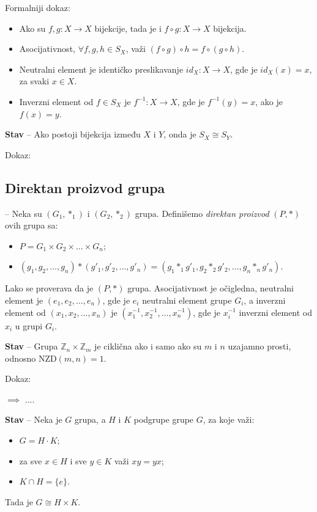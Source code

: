 \documentclass[a4paper,12pt]{article}
\newcommand{\f}[1]{\(#1\)}
\begin{document}
  \medskip
  Formalniji dokaz:

  \begin{itemize}
    \item Ako su \f{f, g: X \rightarrow X} bijekcije, tada je i \f{f \circ g: X \rightarrow X} bijekcija. 
    \item Asocijativnost, \f{ \forall f, g, h \in S_X}, važi \f{(f \circ g) \circ h = f \circ (g \circ h)}.
    \item Neutralni element je identičko preslikavanje \f{id_X: X \rightarrow X}, gde je \f{id_X(x) = x}, za svaki \f{x \in X}.
    \item Inverzni element od \f{f \in S_X} je \f{f^{-1}: X \rightarrow X}, gde je \f{f^{-1}(y) = x}, ako je \f{f(x) = y}.
  \end{itemize} 

  \textbf{Stav} -- Ako postoji bijekcija između \f{X} i \f{Y}, onda je \f{S_X \cong S_Y}.

  Dokaz:

  

  \subsection{Direktan proizvod grupa}

   -- Neka su \f{(G_1, *_1)} i \f{(G_2, *_2)} grupa. Definišemo \emph{direktan proizvod} \f{(P, *)} ovih grupa sa:
 \begin{itemize}
  \item \f{P = G_1 \times G_2 \times \dots \times G_n;}
  \item \f{(g_1,g_2,\dots,g_n) * (g'_1,g'_2,\dots,g'_n) = (g_1 *_1 g'_1, g_2 *_2 g'_2, \dots, g_n *_n g'_n).}
 \end{itemize}
 Lako se proverava da je \f{(P, *)} grupa. Asocijativnost je očigledna, neutralni element je \f{(e_1, e_2, \dots, e_n)}, gde je \f{e_i} neutralni element grupe \f{G_i}, a inverzni element od \f{(x_1, x_2, \dots, x_n)} je \f{(x_1^{-1}, x_2^{-1}, \dots, x_n^{-1})}, gde je \f{x_i^{-1}} inverzni element od \f{x_i} u grupi \f{G_i}.

\textbf{Stav} -- Grupa \f{\mathbb{Z}_n \times \mathbb{Z}_m} je ciklična ako i samo ako su \f{m} i \f{n} uzajamno prosti, odnosno \f{\text{NZD}(m, n) = 1}.

Dokaz:

\f{\implies} ....

\textbf{Stav} -- Neka je \f{G} grupa, a \f{H} i \f{K} podgrupe grupe \f{G}, za koje važi:
\begin{itemize}
  \item \f{G = H \cdot K};
  \item za sve \f{x \in H} i sve \f{y \in K} važi \f{xy = yx};
  \item \f{K \cap H = \{ e \}}.
\end{itemize}
Tada je \f{G \cong H \times K}.
\end{document}
